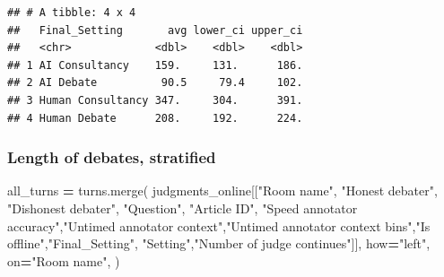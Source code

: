 \documentclass[
]{article}
\newenvironment{Shaded}{\begin{snugshade}}{\end{snugshade}}
\newcommand{\AttributeTok}[1]{\textcolor[rgb]{0.13,0.29,0.53}{#1}}
\newcommand{\ConstantTok}[1]{\textcolor[rgb]{0.56,0.35,0.01}{#1}}
\newcommand{\FunctionTok}[1]{\textcolor[rgb]{0.13,0.29,0.53}{\textbf{#1}}}
\newcommand{\NormalTok}[1]{#1}
\newcommand{\OperatorTok}[1]{\textcolor[rgb]{0.81,0.36,0.00}{\textbf{#1}}}
\newcommand{\OtherTok}[1]{\textcolor[rgb]{0.56,0.35,0.01}{#1}}
\newcommand{\SpecialCharTok}[1]{\textcolor[rgb]{0.81,0.36,0.00}{\textbf{#1}}}
\newcommand{\StringTok}[1]{\textcolor[rgb]{0.31,0.60,0.02}{#1}}
\begin{document}
\begin{verbatim}
## # A tibble: 4 x 4
##   Final_Setting       avg lower_ci upper_ci
##   <chr>             <dbl>    <dbl>    <dbl>
## 1 AI Consultancy    159.     131.      186.
## 2 AI Debate          90.5     79.4     102.
## 3 Human Consultancy 347.     304.      391.
## 4 Human Debate      208.     192.      224.
\end{verbatim}

\subsubsection{Length of debates,
stratified}\label{length-of-debates-stratified}

\begin{Shaded}
\begin{Highlighting}[]
\NormalTok{all\_turns }\OperatorTok{=}\NormalTok{ turns.merge(}
\NormalTok{        judgments\_online[[}\StringTok{"Room name"}\NormalTok{, }\StringTok{"Honest debater"}\NormalTok{, }\StringTok{"Dishonest debater"}\NormalTok{, }\StringTok{"Question"}\NormalTok{, }\StringTok{"Article ID"}\NormalTok{,}
                 \StringTok{"Speed annotator accuracy"}\NormalTok{,}\StringTok{"Untimed annotator context"}\NormalTok{,}\StringTok{"Untimed annotator context bins"}\NormalTok{,}\StringTok{"Is offline"}\NormalTok{,}\StringTok{"Final\_Setting"}\NormalTok{, }\StringTok{"Setting"}\NormalTok{,}\StringTok{"Number of judge continues"}\NormalTok{]],}
\NormalTok{        how}\OperatorTok{=}\StringTok{"left"}\NormalTok{,}
\NormalTok{        on}\OperatorTok{=}\StringTok{"Room name"}\NormalTok{,}
\NormalTok{    )}
\end{Highlighting}
\end{Shaded}

\begin{Shaded}
\end{Shaded}
\end{document}
